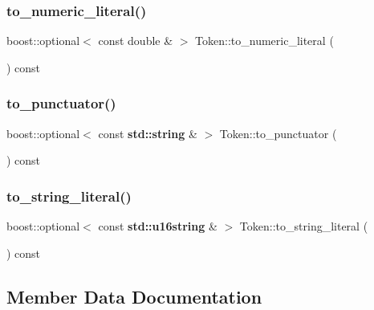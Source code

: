 \subsubsection{\texorpdfstring{to\+\_\+numeric\+\_\+literal()}{to\_numeric\_literal()}}
{\footnotesize\ttfamily boost\+::optional$<$ const double \& $>$ Token\+::to\+\_\+numeric\+\_\+literal (\begin{DoxyParamCaption}{ }\end{DoxyParamCaption}) const}

\mbox{\label{class_token_ad68665bd46eea1e372e6ed9dade2f713}} 
\subsubsection{\texorpdfstring{to\+\_\+punctuator()}{to\_punctuator()}}
{\footnotesize\ttfamily boost\+::optional$<$ const \textbf{ std\+::string} \& $>$ Token\+::to\+\_\+punctuator (\begin{DoxyParamCaption}{ }\end{DoxyParamCaption}) const}

\mbox{\label{class_token_a90405a7051a618d8f838bb2abee8709d}} 
\subsubsection{\texorpdfstring{to\+\_\+string\+\_\+literal()}{to\_string\_literal()}}
{\footnotesize\ttfamily boost\+::optional$<$ const \textbf{ std\+::u16string} \& $>$ Token\+::to\+\_\+string\+\_\+literal (\begin{DoxyParamCaption}{ }\end{DoxyParamCaption}) const}



\subsection{Member Data Documentation}
\mbox{\label{class_token_ae1c97965fb8e3c18c0b4e38b6d826266}} 

